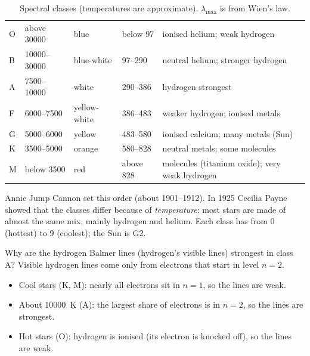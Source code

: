\begin{table}
  \caption{Spectral classes (temperatures are approximate). $\lambda_\mathrm{max}$ is from
    Wien's law.}\label{ch1:tab:classes}
  \centering\small
  \begin{tabular}{@{}C{9mm}L{27mm}L{20mm}L{17mm}L{58mm}@{}}
    \toprule
     &  &  &
       & \\
    \midrule
    O & above \num{30000} & blue & below 97 & ionised helium; weak hydrogen\\
    B & \num{10000}--\num{30000} & blue-white & 97--290 & neutral helium; stronger hydrogen\\
    A & \num{7500}--\num{10000} & white & 290--386 & hydrogen strongest\\
    F & \num{6000}--\num{7500} & yellow-white & 386--483 & weaker hydrogen; ionised metals\\
    G & \num{5000}--\num{6000} & yellow & 483--580 & ionised calcium; many metals (Sun)\\
    K & \num{3500}--\num{5000} & orange & 580--828 & neutral metals; some molecules\\
    M & below \num{3500} & red & above 828 & molecules (titanium oxide); very weak hydrogen\\
    \bottomrule
  \end{tabular}
\end{table}

Annie Jump Cannon set this order (about 1901--1912). In 1925 Cecilia Payne showed that
the classes differ because of \emph{temperature}: most stars are made of almost the same
mix, mainly hydrogen and helium. Each class has  from 0 (hottest) to 9
(coolest); the Sun is G2.

Why are the hydrogen Balmer lines (hydrogen's visible lines) strongest in class A?
Visible hydrogen lines come only from electrons that start in level $n = 2$.
\begin{itemize}
  \item Cool stars (K, M): nearly all electrons sit in $n = 1$, so the lines are weak.
  \item About \qty{10000}{K} (A): the largest share of electrons is in $n = 2$, so the
        lines are strongest.
  \item Hot stars (O): hydrogen is ionised (its electron is knocked off), so the
        lines are weak.
\end{itemize}


